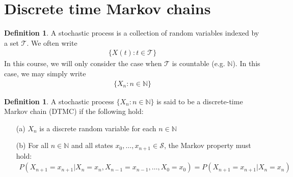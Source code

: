 \documentclass[11pt]{amsart}
\theoremstyle{definition}
\newtheorem{definition}[theorem]{Definition}
\numberwithin{equation}{section}
\begin{document}
 \section{Discrete time Markov chains}
 \begin{definition}
     A stochastic process is a collection of random variables indexed by a set $\mathcal T$. We often write
     \begin{align*}
         \{X(t):t\in\mathcal T\}
     \end{align*}
     In this course, we will only consider the case when $\mathcal T$ is countable (e.g. $\mathbb N$). In this case, we may simply write
     \begin{align*}
         \{X_n:n\in\mathbb N\}
     \end{align*}
 \end{definition}
 \begin{definition}
     A stochastic process $\{X_n:n\in\mathbb N\}$ is said to be a discrete-time Markov chain (DTMC) if the following hold:
     \begin{enumerate}
         \item [(a)] $X_n$ is a discrete random variable for each $n\in\mathbb N$
         \item [(b)] For all $n\in\mathbb N$ and all states $x_0,\ldots,x_{n+1}\in\mathcal S$, the Markov property must hold:
         \begin{align*}
             P(X_{n+1}=x_{n+1}|X_n=x_n,X_{n-1}=x_{n-1},\ldots,X_0=x_0)=P(X_{n+1}=x_{n+1}|X_n=x_n)
         \end{align*}
     \end{enumerate}
 \end{definition}
\end{document}
